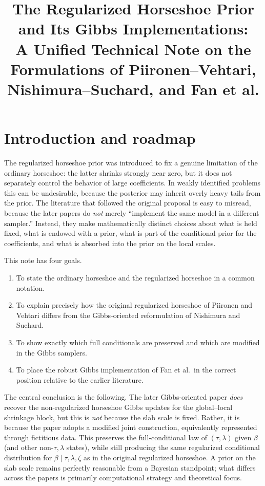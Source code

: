 \documentclass[11pt]{article}
\title{The Regularized Horseshoe Prior and Its Gibbs Implementations:\\
A Unified Technical Note on the Formulations of Piironen--Vehtari, Nishimura--Suchard, and Fan et al.}
\author{}
\date{}
\begin{document}
\maketitle
\tableofcontents

\section{Introduction and roadmap}

The regularized horseshoe prior was introduced to fix a genuine limitation of the ordinary horseshoe: the latter shrinks strongly near zero, but it does not separately control the behavior of large coefficients. In weakly identified problems this can be undesirable, because the posterior may inherit overly heavy tails from the prior. The literature that followed the original proposal is easy to misread, because the later papers do \emph{not} merely ``implement the same model in a different sampler.'' Instead, they make mathematically distinct choices about what is held fixed, what is endowed with a prior, what is part of the conditional prior for the coefficients, and what is absorbed into the prior on the local scales.

This note has four goals.

\begin{enumerate}
\item To state the ordinary horseshoe and the regularized horseshoe in a common notation.
\item To explain precisely how the original regularized horseshoe of Piironen and Vehtari differs from the Gibbs-oriented reformulation of Nishimura and Suchard.
\item To show exactly which full conditionals are preserved and which are modified in the Gibbs samplers.
\item To place the robust Gibbs implementation of Fan et al.\ in the correct position relative to the earlier literature.
\end{enumerate}

The central conclusion is the following. The later Gibbs-oriented paper \emph{does} recover the non-regularized horseshoe Gibbs updates for the global--local shrinkage block, but this is \emph{not} because the slab scale is fixed. Rather, it is because the paper adopts a modified joint construction, equivalently represented through fictitious data. This preserves the full-conditional law of $(\tau,\lambda)$ given $\beta$ (and other non-$\tau,\lambda$ states), while still producing the same regularized conditional distribution for $\beta \mid \tau,\lambda,\zeta$ as in the original regularized horseshoe. A prior on the slab scale remains perfectly reasonable from a Bayesian standpoint; what differs across the papers is primarily computational strategy and theoretical focus.
\end{document}
